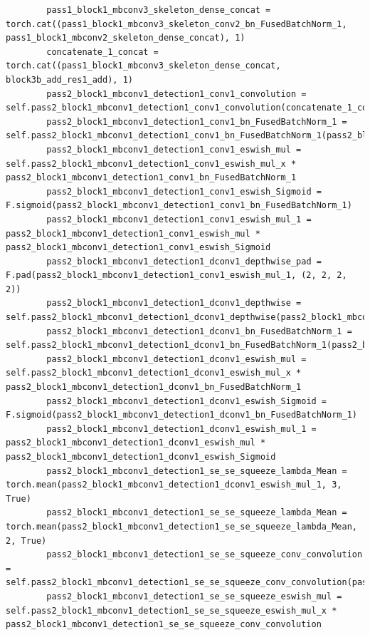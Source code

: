 \documentclass{fisatprojectfinal}
\begin{document}
\begin{appendices}
\begin{lstlisting}
        pass1_block1_mbconv3_skeleton_dense_concat = torch.cat((pass1_block1_mbconv3_skeleton_conv2_bn_FusedBatchNorm_1, pass1_block1_mbconv2_skeleton_dense_concat), 1)
        concatenate_1_concat = torch.cat((pass1_block1_mbconv3_skeleton_dense_concat, block3b_add_res1_add), 1)
        pass2_block1_mbconv1_detection1_conv1_convolution = self.pass2_block1_mbconv1_detection1_conv1_convolution(concatenate_1_concat)
        pass2_block1_mbconv1_detection1_conv1_bn_FusedBatchNorm_1 = self.pass2_block1_mbconv1_detection1_conv1_bn_FusedBatchNorm_1(pass2_block1_mbconv1_detection1_conv1_convolution)
        pass2_block1_mbconv1_detection1_conv1_eswish_mul = self.pass2_block1_mbconv1_detection1_conv1_eswish_mul_x * pass2_block1_mbconv1_detection1_conv1_bn_FusedBatchNorm_1
        pass2_block1_mbconv1_detection1_conv1_eswish_Sigmoid = F.sigmoid(pass2_block1_mbconv1_detection1_conv1_bn_FusedBatchNorm_1)
        pass2_block1_mbconv1_detection1_conv1_eswish_mul_1 = pass2_block1_mbconv1_detection1_conv1_eswish_mul * pass2_block1_mbconv1_detection1_conv1_eswish_Sigmoid
        pass2_block1_mbconv1_detection1_dconv1_depthwise_pad = F.pad(pass2_block1_mbconv1_detection1_conv1_eswish_mul_1, (2, 2, 2, 2))
        pass2_block1_mbconv1_detection1_dconv1_depthwise = self.pass2_block1_mbconv1_detection1_dconv1_depthwise(pass2_block1_mbconv1_detection1_dconv1_depthwise_pad)
        pass2_block1_mbconv1_detection1_dconv1_bn_FusedBatchNorm_1 = self.pass2_block1_mbconv1_detection1_dconv1_bn_FusedBatchNorm_1(pass2_block1_mbconv1_detection1_dconv1_depthwise)
        pass2_block1_mbconv1_detection1_dconv1_eswish_mul = self.pass2_block1_mbconv1_detection1_dconv1_eswish_mul_x * pass2_block1_mbconv1_detection1_dconv1_bn_FusedBatchNorm_1
        pass2_block1_mbconv1_detection1_dconv1_eswish_Sigmoid = F.sigmoid(pass2_block1_mbconv1_detection1_dconv1_bn_FusedBatchNorm_1)
        pass2_block1_mbconv1_detection1_dconv1_eswish_mul_1 = pass2_block1_mbconv1_detection1_dconv1_eswish_mul * pass2_block1_mbconv1_detection1_dconv1_eswish_Sigmoid
        pass2_block1_mbconv1_detection1_se_se_squeeze_lambda_Mean = torch.mean(pass2_block1_mbconv1_detection1_dconv1_eswish_mul_1, 3, True)
        pass2_block1_mbconv1_detection1_se_se_squeeze_lambda_Mean = torch.mean(pass2_block1_mbconv1_detection1_se_se_squeeze_lambda_Mean, 2, True)
        pass2_block1_mbconv1_detection1_se_se_squeeze_conv_convolution = self.pass2_block1_mbconv1_detection1_se_se_squeeze_conv_convolution(pass2_block1_mbconv1_detection1_se_se_squeeze_lambda_Mean)
        pass2_block1_mbconv1_detection1_se_se_squeeze_eswish_mul = self.pass2_block1_mbconv1_detection1_se_se_squeeze_eswish_mul_x * pass2_block1_mbconv1_detection1_se_se_squeeze_conv_convolution

\end{lstlisting}
\end{appendices}
\end{document}
